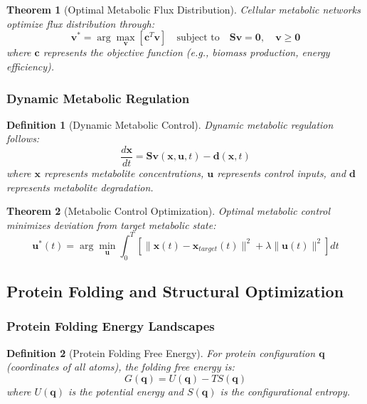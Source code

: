 \documentclass[12pt,a4paper]{article}
\newtheorem{theorem}{Theorem}
\newtheorem{definition}{Definition}
\begin{document}
\begin{theorem}[Optimal Metabolic Flux Distribution]
Cellular metabolic networks optimize flux distribution through:
\begin{equation}
\mathbf{v}^* = \arg\max_{\mathbf{v}} \left[ \mathbf{c}^T \mathbf{v} \right] \quad \text{subject to} \quad \mathbf{S} \mathbf{v} = \mathbf{0}, \quad \mathbf{v} \geq \mathbf{0}
\end{equation}
where $\mathbf{c}$ represents the objective function (e.g., biomass production, energy efficiency).
\end{theorem}

\subsubsection{Dynamic Metabolic Regulation}

\begin{definition}[Dynamic Metabolic Control]
Dynamic metabolic regulation follows:
\begin{equation}
\frac{d\mathbf{x}}{dt} = \mathbf{S} \mathbf{v}(\mathbf{x}, \mathbf{u}, t) - \mathbf{d}(\mathbf{x}, t)
\end{equation}
where $\mathbf{x}$ represents metabolite concentrations, $\mathbf{u}$ represents control inputs, and $\mathbf{d}$ represents metabolite degradation.
\end{definition}

\begin{theorem}[Metabolic Control Optimization]
Optimal metabolic control minimizes deviation from target metabolic state:
\begin{equation}
\mathbf{u}^*(t) = \arg\min_{\mathbf{u}} \int_0^T \left[ \|\mathbf{x}(t) - \mathbf{x}_{target}(t)\|^2 + \lambda \|\mathbf{u}(t)\|^2 \right] dt
\end{equation}
\end{theorem}

\subsection{Protein Folding and Structural Optimization}

\subsubsection{Protein Folding Energy Landscapes}

\begin{definition}[Protein Folding Free Energy]
For protein configuration $\mathbf{q}$ (coordinates of all atoms), the folding free energy is:
\begin{equation}
G(\mathbf{q}) = U(\mathbf{q}) - TS(\mathbf{q})
\end{equation}
where $U(\mathbf{q})$ is the potential energy and $S(\mathbf{q})$ is the configurational entropy.
\end{definition}
\end{document}
